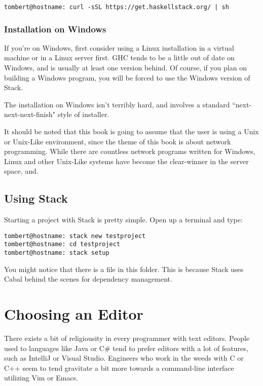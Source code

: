 \begin{verbatim}
tombert@hostname: curl -sSL https://get.haskellstack.org/ | sh
\end{verbatim}

\subsubsection{Installation on Windows}
If you're on Windows, first consider using a Linux installation in a virtual machine or in a Linux server first.  GHC tends to be a little out of date on Windows, and is usually at least one version behind. Of course, if you plan on building a Windows program, you will be forced to use the Windows version of Stack. 

The installation on Windows isn't terribly hard, and involves a standard ``next-next-next-finish" style of installer. 

It should be noted that this book is going to assume that the user is using a Unix or Unix-Like environment, since the theme of this book is about network programming.  While there are countless network programs written for Windows, Linux and other Unix-Like systems have become the clear-winner in the server space, and. 


\subsection{Using Stack}

Starting a project with Stack is pretty simple. Open up a terminal and type: 

\begin{verbatim}
tombert@hostname: stack new testproject
tombert@hostname: cd testproject
tombert@hostname: stack setup
\end{verbatim}

You might notice that there is a  file in this folder.  This is because Stack uses Cabal behind the scenes for dependency management. 

\section{Choosing an Editor}

There exists a bit of religiousity in every programmer with text editors.  People used to languages like Java or C\# tend to prefer editors with a lot of features, such as IntelliJ or Visual Studio.  Engineers who work in the weeds with C or C++ seem to tend gravitate a bit more towards a command-line interface utilizing Vim or Emacs.  

